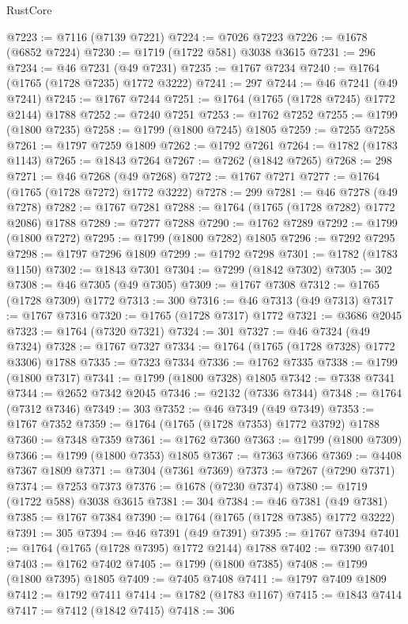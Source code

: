 \begin{lexlean}{RustCore}
\begin{coremodule}
@7223 := @7116 (@7139 @7221)
@7224 := @7026 @7223
@7226 := @1678 (@6852 @7224)
@7230 := @1719 (@1722 @581) @3038 @3615
@7231 := 296
@7234 := @46 @7231 (@49 @7231)
@7235 := @1767 @7234
@7240 := @1764 (@1765 (@1728 @7235) @1772 @3222)
@7241 := 297
@7244 := @46 @7241 (@49 @7241)
@7245 := @1767 @7244
@7251 := @1764 (@1765 (@1728 @7245) @1772 @2144) @1788
@7252 := @7240 @7251
@7253 := @1762 @7252
@7255 := @1799 (@1800 @7235)
@7258 := @1799 (@1800 @7245) @1805
@7259 := @7255 @7258
@7261 := @1797 @7259 @1809
@7262 := @1792 @7261
@7264 := @1782 (@1783 @1143)
@7265 := @1843 @7264
@7267 := @7262 (@1842 @7265)
@7268 := 298
@7271 := @46 @7268 (@49 @7268)
@7272 := @1767 @7271
@7277 := @1764 (@1765 (@1728 @7272) @1772 @3222)
@7278 := 299
@7281 := @46 @7278 (@49 @7278)
@7282 := @1767 @7281
@7288 := @1764 (@1765 (@1728 @7282) @1772 @2086) @1788
@7289 := @7277 @7288
@7290 := @1762 @7289
@7292 := @1799 (@1800 @7272)
@7295 := @1799 (@1800 @7282) @1805
@7296 := @7292 @7295
@7298 := @1797 @7296 @1809
@7299 := @1792 @7298
@7301 := @1782 (@1783 @1150)
@7302 := @1843 @7301
@7304 := @7299 (@1842 @7302)
@7305 := 302
@7308 := @46 @7305 (@49 @7305)
@7309 := @1767 @7308
@7312 := @1765 (@1728 @7309) @1772
@7313 := 300
@7316 := @46 @7313 (@49 @7313)
@7317 := @1767 @7316
@7320 := @1765 (@1728 @7317) @1772
@7321 := @3686 @2045
@7323 := @1764 (@7320 @7321)
@7324 := 301
@7327 := @46 @7324 (@49 @7324)
@7328 := @1767 @7327
@7334 := @1764 (@1765 (@1728 @7328) @1772 @3306) @1788
@7335 := @7323 @7334
@7336 := @1762 @7335
@7338 := @1799 (@1800 @7317)
@7341 := @1799 (@1800 @7328) @1805
@7342 := @7338 @7341
@7344 := @2652 @7342 @2045
@7346 := @2132 (@7336 @7344)
@7348 := @1764 (@7312 @7346)
@7349 := 303
@7352 := @46 @7349 (@49 @7349)
@7353 := @1767 @7352
@7359 := @1764 (@1765 (@1728 @7353) @1772 @3792) @1788
@7360 := @7348 @7359
@7361 := @1762 @7360
@7363 := @1799 (@1800 @7309)
@7366 := @1799 (@1800 @7353) @1805
@7367 := @7363 @7366
@7369 := @4408 @7367 @1809
@7371 := @7304 (@7361 @7369)
@7373 := @7267 (@7290 @7371)
@7374 := @7253 @7373
@7376 := @1678 (@7230 @7374)
@7380 := @1719 (@1722 @588) @3038 @3615
@7381 := 304
@7384 := @46 @7381 (@49 @7381)
@7385 := @1767 @7384
@7390 := @1764 (@1765 (@1728 @7385) @1772 @3222)
@7391 := 305
@7394 := @46 @7391 (@49 @7391)
@7395 := @1767 @7394
@7401 := @1764 (@1765 (@1728 @7395) @1772 @2144) @1788
@7402 := @7390 @7401
@7403 := @1762 @7402
@7405 := @1799 (@1800 @7385)
@7408 := @1799 (@1800 @7395) @1805
@7409 := @7405 @7408
@7411 := @1797 @7409 @1809
@7412 := @1792 @7411
@7414 := @1782 (@1783 @1167)
@7415 := @1843 @7414
@7417 := @7412 (@1842 @7415)
@7418 := 306

\end{coremodule}
\end{lexlean}
